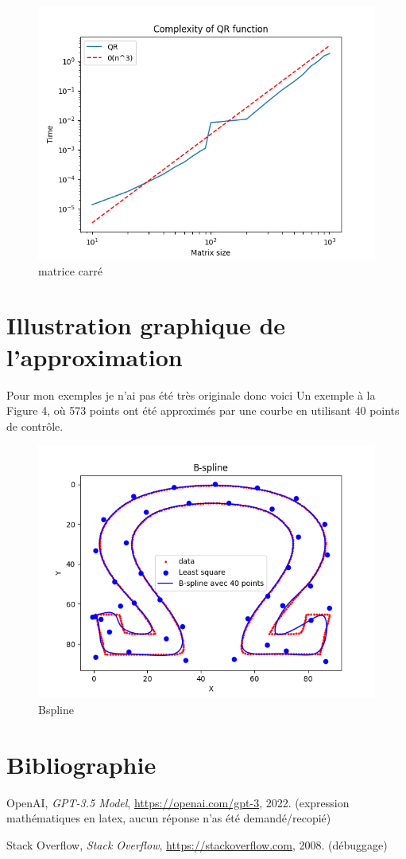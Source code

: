 \documentclass[11pt]{article}
\begin{document}
\begin{figure}[h!]
  \centering
  \includegraphics[width=0.7\linewidth]{QR.png}
  \caption{matrice carré}
  \label{fig:3}
\end{figure}




\section{Illustration graphique de l'approximation}
Pour mon exemples je n'ai pas été très originale donc voici Un exemple à la Figure 4, où 573 points ont été approximés par
une courbe en utilisant 40 points de contrôle.

\begin{figure}[h!]
  \centering
  \includegraphics[width=1\linewidth]{Bspline.png}
  \caption{Bspline}
  \label{fig:3}
\end{figure}


\section*{Bibliographie}
\begin{thebibliography}{9}
  OpenAI,
  \emph{GPT-3.5 Model},
  \url{https://openai.com/gpt-3},
  2022.
(expression mathématiques en latex, aucun réponse n'as été demandé/recopié)

  Stack Overflow,
  \emph{Stack Overflow},
  \url{https://stackoverflow.com},
  2008.
  (débuggage)
\end{thebibliography}
\end{document}
